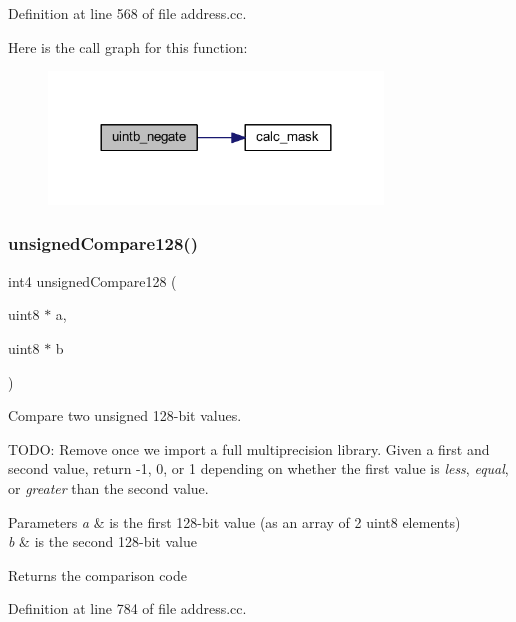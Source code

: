 Definition at line 568 of file address.\+cc.

Here is the call graph for this function\+:
\nopagebreak
\begin{figure}[H]
\begin{center}
\leavevmode
\includegraphics[width=252pt]{address_8hh_a78cde28c4eada28e12fe0dbdfb840753_cgraph}
\end{center}
\end{figure}
\mbox{\label{address_8hh_ad5b0ee7c5f0453d92bd8ca35876f2728}} 
\subsubsection{\texorpdfstring{unsignedCompare128()}{unsignedCompare128()}}
{\footnotesize\ttfamily int4 unsigned\+Compare128 (\begin{DoxyParamCaption}\item[{uint8 $\ast$}]{a,  }\item[{uint8 $\ast$}]{b }\end{DoxyParamCaption})}



Compare two unsigned 128-\/bit values. 

T\+O\+DO\+: Remove once we import a full multiprecision library. Given a first and second value, return -\/1, 0, or 1 depending on whether the first value is {\itshape less}, {\itshape equal}, or {\itshape greater} than the second value. 
\begin{DoxyParams}{Parameters}
{\em a} & is the first 128-\/bit value (as an array of 2 uint8 elements) \\
\hline
{\em b} & is the second 128-\/bit value \\
\hline
\end{DoxyParams}
\begin{DoxyReturn}{Returns}
the comparison code 
\end{DoxyReturn}


Definition at line 784 of file address.\+cc.

